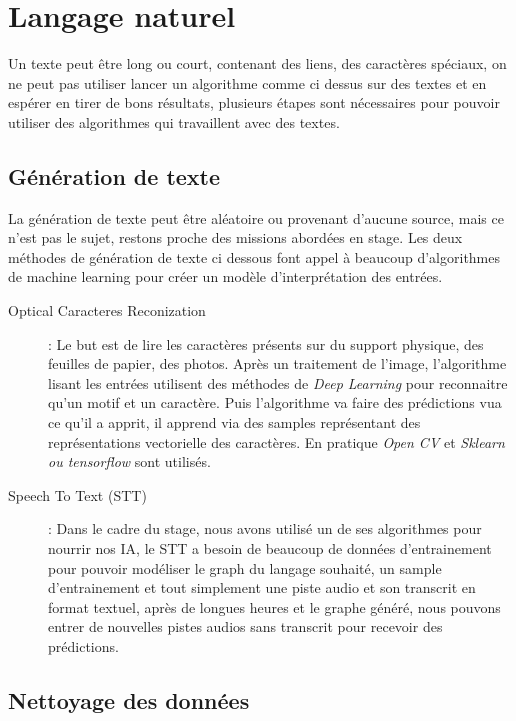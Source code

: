 \section{Langage naturel}

Un texte peut être long ou court, contenant des liens, des caractères spéciaux, on ne peut pas utiliser lancer un algorithme comme ci dessus sur des textes et en espérer en tirer de bons résultats, plusieurs étapes sont nécessaires pour pouvoir utiliser des algorithmes qui travaillent avec des textes. 

\subsection{Génération de texte}
La génération de texte peut être aléatoire ou provenant d'aucune source, mais ce n'est pas le sujet, restons proche des missions abordées en stage. Les deux méthodes de génération de texte ci dessous font appel à beaucoup d'algorithmes de machine learning pour créer un modèle d'interprétation des entrées.

\begin{description}
\item[Optical Caracteres Reconization]: Le but est de lire les caractères présents sur du support physique, des feuilles de papier, des photos. Après un traitement de l'image, l'algorithme lisant les entrées utilisent des méthodes de \textit{Deep Learning} pour reconnaitre qu'un motif et un caractère. Puis l'algorithme va faire des prédictions vua ce qu'il a apprit, il apprend via des samples représentant des représentations vectorielle des caractères. En pratique \textit{Open CV} et \textit{Sklearn ou tensorflow} sont utilisés.

\item[Speech To Text (STT)]: Dans le cadre du stage, nous avons utilisé un de ses algorithmes pour nourrir nos IA, le STT a besoin de beaucoup de données d'entrainement pour pouvoir modéliser le graph du langage souhaité, un sample d'entrainement et tout simplement une piste audio et son transcrit en format textuel, après de longues heures et le graphe généré, nous pouvons entrer de nouvelles pistes audios sans transcrit pour recevoir des prédictions.
\end{description}

\pagebreak
\subsection{Nettoyage des données}

